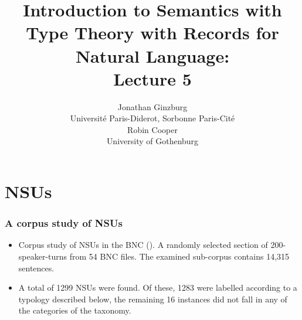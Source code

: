 \documentclass{beamer}
\title{Introduction to  Semantics with Type Theory with Records for Natural Language:\\
  Lecture 5     }
\author{Jonathan Ginzburg\\
Universit\'e Paris-Diderot, Sorbonne Paris-Cit\'e\\
Robin Cooper\\ 
University of Gothenburg}
\date{}
\newcommand{\ignore}[1]{}
\begin{document}
\maketitle


\ignore{
Lecture 4.
We provide a unified theory of metacommunicative and illocutionary interaction on the basis of the notion of Austinian locutionary propositions. This provides a basis for describing various linguistic phenomena occuring during grounding and clarification interaction.
}



\section{NSUs}



\begin{frame}\frametitle{A corpus study of NSUs}

\begin{itemize}

\item Corpus study of NSUs in the BNC
  (\cite{fernandez-ginzburg-tal,raquel-diss}). A randomly selected
  section of 200-speaker-turns from 54 BNC files.  The examined
  sub-corpus contains 14,315 sentences.


\item A total of 1299 NSUs were found.  Of these, 1283 were labelled
  according to a typology described below, the remaining 16 instances
  did not fall in any of the categories of the taxonomy.

\ignore{
\item 
The labelling of the entire corpus of NSUs was done by one expert
annotator.

\item Two additional, non-expert annotators
annotated a total of 50 randomly selected instances  with the classes in the taxonomy.  


\item  $\kappa$:  0.76.  The non-expert annotators
  also achieved 92 \% and 96\% in antecedent sentence identification
  for each NSU, relative to expert annotation as a gold standard.}
  \end{itemize}\end{frame}
\end{document}
